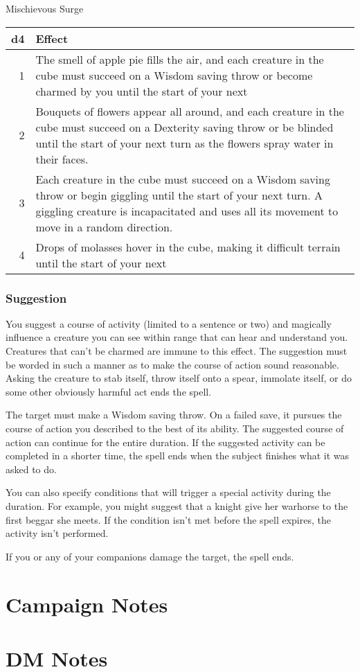 \documentclass[11pt]{article}
\begin{document}
Mischievous Surge
\begin{center}
\begin{tabular}{rl}
d4 & Effect\\
\hline
1 & The smell of apple pie fills the air, and each creature in the cube must succeed on a Wisdom saving throw or become charmed by you until the start of your next\\
2 & Bouquets of flowers appear all around, and each creature in the cube must succeed on a Dexterity saving throw or be blinded until the start of your next turn as the flowers spray water in their faces.\\
3 & Each creature in the cube must succeed on a Wisdom saving throw or begin giggling until the start of your next turn. A giggling creature is incapacitated and uses all its movement to move in a random direction.\\
4 & Drops of molasses hover in the cube, making it difficult terrain until the start of your next\\
\end{tabular}
\end{center}
\subsubsection{Suggestion}
\label{sec:org2a7579c}
You suggest a course of activity (limited to a sentence or two) and magically influence a creature you can see within range that can hear and understand you. Creatures that can't be charmed are immune to this effect. The suggestion must be worded in such a manner as to make the course of action sound reasonable. Asking the creature to stab itself, throw itself onto a spear, immolate itself, or do some other obviously harmful act ends the spell.

The target must make a Wisdom saving throw. On a failed save, it pursues the course of action you described to the best of its ability. The suggested course of action can continue for the entire duration. If the suggested activity can be completed in a shorter time, the spell ends when the subject finishes what it was asked to do.

You can also specify conditions that will trigger a special activity during the duration. For example, you might suggest that a knight give her warhorse to the first beggar she meets. If the condition isn't met before the spell expires, the activity isn't performed.

If you or any of your companions damage the target, the spell ends.
\section{Campaign Notes}
\label{sec:org1b1d505}
\section{DM Notes}
\label{sec:orge6fca54}
\end{document}

